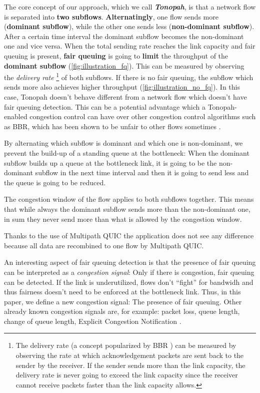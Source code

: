 \documentclass[conference]{IEEEtran}
\begin{document}
The core concept of our approach, which we call \textbf{\textit{Tonopah}}, is that a network flow is separated into \textbf{two subflows}. 
\textbf{Alternatingly}, one flow sends more (\textbf{dominant subflow}), while the other one sends less (\textbf{non-dominant subflow}). 
After a certain time interval the dominant subflow becomes the non-dominant one and vice versa. 
When the total sending rate reaches the link capacity and fair queuing is present, 
\textbf{fair queuing} is going to \textbf{limit} the throughput of the \textbf{dominant subflow} (\autoref{fig:illustration_fq}). 
This can be measured by observing the \textit{delivery rate}
\footnote{The delivery rate (a concept popularized by BBR \cite{cardwell_bbr_2016}) can be measured by observing the rate at which acknowledgement packets are sent back to the sender by the receiver.
If the sender sends more than the link capacity, the delivery rate is never going to exceed the link capacity since the receiver cannot receive packets faster than the link capacity allows. 
}
of both subflows. If there is no fair queuing, the subflow which sends more also achieves higher throughput (\autoref{fig:illustration_no_fq}). 
In this case, Tonopah doesn't behave different from a network flow which doesn't have fair queuing detection. 
This can be a potential advantage which a Tonopah-enabled congestion control can have over other congestion control algorithms such as BBR, which has been shown to be unfair to other flows sometimes \cite{ware_modeling_2019,hock_experimental_2017}.

By alternating which subflow is dominant and which one is non-dominant, we prevent the build-up of a standing queue at the bottleneck: 
When the dominant subflow builds up a queue at the bottleneck link, it is going to be the non-dominant subflow in the next time interval and then it is going to send less and the queue is going to be reduced. 

The congestion window of the flow applies to both subflows together. This means that while always the dominant subflow sends more than the non-dominant one, in sum they never send more than what is allowed by the congestion window.

Thanks to the use of Multipath QUIC \cite{liu_multipath_2022} the application does not see any difference because all data are recombined to one flow by Multipath QUIC. 

An interesting aspect of fair queuing detection is that the presence of fair queuing can be interpreted as a \textit{congestion signal}: 
Only if there is congestion, fair queuing can be detected. If the link is underutilized, flows don't ``fight'' for bandwidh and thus fairness doesn't need to be enforced at the bottleneck link. 
Thus, in this paper, we define a new congestion signal: The presence of fair queuing. Other already known congestion signals are, for example: 
packet loss, queue length, change of queue length, Explicit Congestion Notification \cite{mathis_relentless_2009,hayes_revisiting_2011}. 
\end{document}
